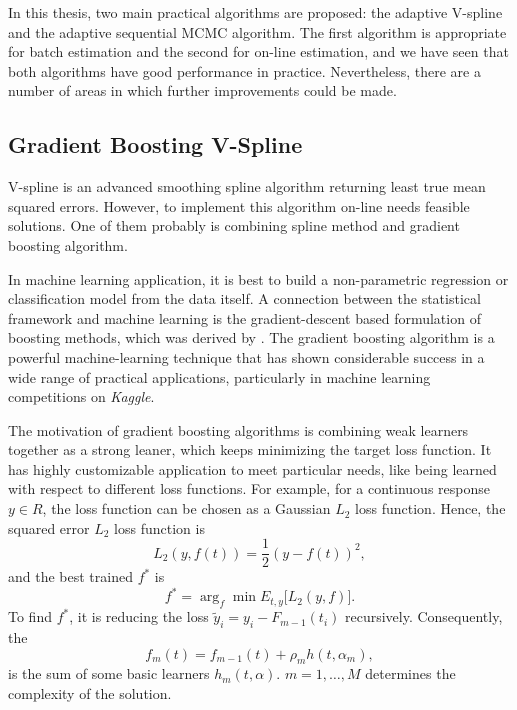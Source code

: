 
In this thesis, two main practical algorithms are proposed: the adaptive V-spline and the adaptive sequential MCMC algorithm. The first algorithm is appropriate for batch estimation and the second for on-line estimation, and we have seen that both algorithms have good performance in practice. Nevertheless, there are a number of areas in which further improvements could be made.


\subsection*{Gradient Boosting V-Spline}

V-spline is an advanced smoothing spline algorithm returning least true mean squared errors. However, to implement this algorithm on-line needs feasible solutions. One of them probably is combining spline method and gradient boosting algorithm. 


In machine learning application, it is best to build a non-parametric regression or classification model from the data itself. A connection between the statistical framework and machine learning is the gradient-descent based formulation of boosting methods, which was derived by \cite{freund1995desicion, friedman2001greedy}. The gradient boosting algorithm is a powerful machine-learning technique that has shown considerable success in a wide range of practical applications, particularly in machine learning competitions on \textit{Kaggle}. 


The motivation of gradient boosting algorithms is combining weak learners together as a strong leaner, which keeps minimizing the target loss function. 
It has highly customizable application to meet particular needs, like being learned with respect to different loss functions. For example, for a continuous response $y\in \mathit{R}$, the loss function can be chosen as a Gaussian $L_2$ loss function. Hence, the squared error $L_2$ loss function is 
\begin{equation*}
L_2(y,f(t)) = \frac{1}{2}\left(y-f(t)\right)^2,
\end{equation*}
and the best trained $f^*$ is 
\begin{equation*}
f^* = \arg_{f}\min E_{t,y}\lbrack L_2\left(y,f\right)\rbrack.
\end{equation*}
To find $f^*$, it is reducing the loss $\tilde{y}_i=y_i-F_{m-1}(t_i)$ recursively. Consequently, the 
\begin{equation*}
f_m(t) = f_{m-1}(t)+ \rho_mh(t,\alpha_m),
\end{equation*}
is the sum of some basic learners $h_m(t,\alpha)$. $m=1,\ldots,M$ determines the complexity of the solution. 


